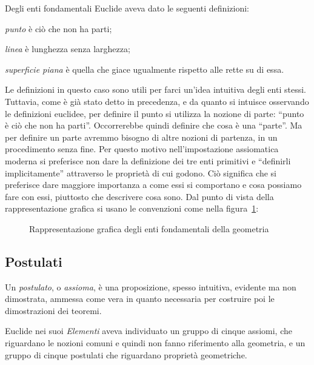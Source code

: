 Degli enti fondamentali Euclide aveva dato le seguenti definizioni:
\begin{itemize*}
\item \emph{punto} è ciò che non ha parti;
\item \emph{linea} è lunghezza senza larghezza;
\item \emph{superficie piana} è quella che giace ugualmente rispetto alle rette su di essa.
\end{itemize*}
Le definizioni in questo caso sono utili per farci un'idea intuitiva degli enti stessi. Tuttavia, come è già stato detto in precedenza, e da quanto si intuisce osservando le definizioni euclidee, per definire il punto si utilizza la nozione di parte: ``punto è ciò che non ha parti''. Occorrerebbe quindi definire che cosa è una ``parte''. Ma per definire un parte avremmo bisogno di altre nozioni di partenza, in un procedimento senza fine. Per questo motivo nell'impostazione assiomatica moderna si preferisce non dare la definizione dei tre enti primitivi e ``definirli implicitamente'' attraverso le proprietà di cui godono. Ciò significa che si preferisce dare maggiore importanza a come essi si comportano e cosa possiamo fare con essi, piuttosto che descrivere cosa sono.
Dal punto di vista della rappresentazione grafica si usano le convenzioni come nella figura~\ref{fig:1.2}:
% 
\begin{figure}[htb]
 \centering
 \caption{Rappresentazione grafica degli enti fondamentali della geometria}\label{fig:1.2}
\end{figure}

\subsection{Postulati}

Un \emph{postulato}, o \emph{assioma}, è una proposizione, spesso intuitiva, evidente ma non dimostrata, ammessa come vera in quanto necessaria per costruire poi le dimostrazioni dei teoremi.

Euclide nei suoi \emph{Elementi} aveva individuato un gruppo di cinque assiomi, che riguardano le nozioni comuni e quindi non fanno riferimento alla geometria, e un gruppo di cinque postulati che riguardano proprietà geometriche.

